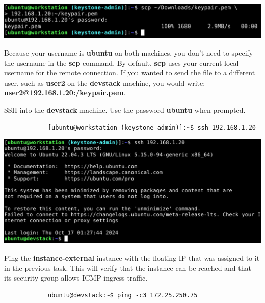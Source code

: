 \documentclass[letterpaper, 12pt]{article}
\begin{document}
\begin{enumerate}
\begin{labstep}
        \begin{center}
            \includegraphics[width=\linewidth]{images/part9/step38.png}
        \end{center}
    \end{labstep}

    \begin{notebox}
        Because your username is \textbf{ubuntu} on both machines, you don't need to specify the username in the \textbf{scp} command.
        By default, \textbf{scp} uses your current local username for the remote connection.
        If you wanted to send the file to a different user, such as \textbf{user2} on the \textbf{devstack} machine, you would write: \textbf{user2@192.168.1.20:\texttildemid/keypair.pem}.
    \end{notebox}

    \begin{labstep}
        SSH into the \textbf{devstack} machine.
        Use the password \textbf{ubuntu} when prompted.
        \begin{lstlisting}
            [ubuntu@workstation (keystone-admin)]:~$ ssh 192.168.1.20
        \end{lstlisting}

        \begin{center}
            \includegraphics[width=\linewidth]{images/part9/step39.png}
        \end{center}
    \end{labstep}

    \begin{labstep}
        Ping the \textbf{instance-external} instance with the floating IP that was assigned to it in the previous task.
        This will verify that the instance can be reached and that its security group allows ICMP ingress traffic.
        \begin{lstlisting}
            ubuntu@devstack:~$ ping -c3 172.25.250.75
        \end{lstlisting}


\end{labstep}
\end{enumerate}
\end{document}
